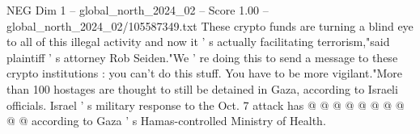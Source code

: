 \begin{textsample}{NEG Dim 1 – global\_north\_2024\_02 – Score 1.00 – global\_north\_2024\_02/105587349.txt}
These crypto funds are turning a blind eye to all of this illegal activity and now it ' s actually facilitating terrorism,"said plaintiff ' s attorney Rob Seiden."We ' re doing this to send a message to these crypto institutions : you can't do this stuff.
You have to be more vigilant."More than 100 hostages are thought to still be detained in Gaza, according to Israeli officials.
Israel ' s military response to the Oct. 7 attack has @ @ @ @ @ @ @ @ @ @ according to Gaza ' s Hamas-controlled Ministry of Health.

\end{textsample}
